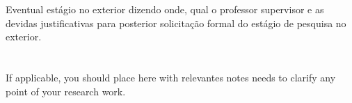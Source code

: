 \documentclass[12pt,a4paper]{article}
\begin{document}
\section{\sectionVIII}
\label{sec:pesquisa-exterior}
Eventual estágio no exterior dizendo onde, qual o professor supervisor e as devidas justificativas para posterior solicitação formal do estágio de pesquisa no exterior.

\section{\sectionIX}
\label{sec:general-notes}
If applicable, you should place here with relevantes notes needs to clarify any point of your research work.




\listoftodos
\end{document}
